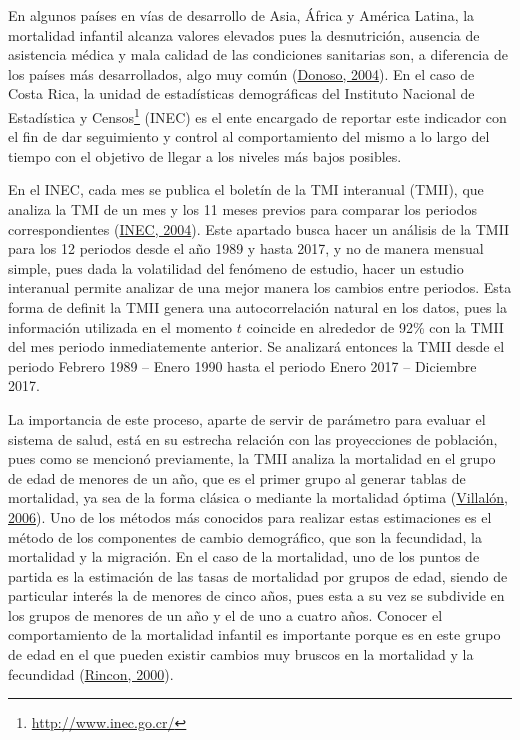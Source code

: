 \documentclass[
]{article}
\begin{document}
En algunos países en vías de desarrollo de Asia, África y América
Latina, la mortalidad infantil alcanza valores elevados pues la
desnutrición, ausencia de asistencia médica y mala calidad de las
condiciones sanitarias son, a diferencia de los países más
desarrollados, algo muy común (\protect\hyperlink{ref-donoso}{Donoso,
2004}). En el caso de Costa Rica, la unidad de estadísticas demográficas
del Instituto Nacional de Estadística y Censos\footnote{\url{http://www.inec.go.cr/}}
(INEC) es el ente encargado de reportar este indicador con el fin de dar
seguimiento y control al comportamiento del mismo a lo largo del tiempo
con el objetivo de llegar a los niveles más bajos posibles.

En el INEC, cada mes se publica el boletín de la TMI interanual (TMII),
que analiza la TMI de un mes y los 11 meses previos para comparar los
periodos correspondientes (\protect\hyperlink{ref-infantiles}{INEC,
2004}). Este apartado busca hacer un análisis de la TMII para los 12
periodos desde el año 1989 y hasta 2017, y no de manera mensual simple,
pues dada la volatilidad del fenómeno de estudio, hacer un estudio
interanual permite analizar de una mejor manera los cambios entre
periodos. Esta forma de definit la TMII genera una autocorrelación
natural en los datos, pues la información utilizada en el momento \(t\)
coincide en alrededor de 92\% con la TMII del mes periodo inmediatemente
anterior. Se analizará entonces la TMII desde el periodo Febrero 1989 --
Enero 1990 hasta el periodo Enero 2017 -- Diciembre 2017.

La importancia de este proceso, aparte de servir de parámetro para
evaluar el sistema de salud, está en su estrecha relación con las
proyecciones de población, pues como se mencionó previamente, la TMII
analiza la mortalidad en el grupo de edad de menores de un año, que es
el primer grupo al generar tablas de mortalidad, ya sea de la forma
clásica o mediante la mortalidad óptima
(\protect\hyperlink{ref-mortalidad_optima}{Villalón, 2006}). Uno de los
métodos más conocidos para realizar estas estimaciones es el método de
los componentes de cambio demográfico, que son la fecundidad, la
mortalidad y la migración. En el caso de la mortalidad, uno de los
puntos de partida es la estimación de las tasas de mortalidad por grupos
de edad, siendo de particular interés la de menores de cinco años, pues
esta a su vez se subdivide en los grupos de menores de un año y el de
uno a cuatro años. Conocer el comportamiento de la mortalidad infantil
es importante porque es en este grupo de edad en el que pueden existir
cambios muy bruscos en la mortalidad y la fecundidad
(\protect\hyperlink{ref-Rincon}{Rincon, 2000}).
\end{document}
